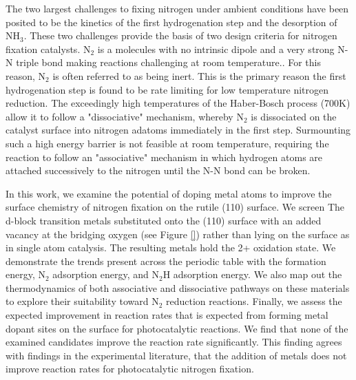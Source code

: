 \documentclass[catalysts,article,submit,moreauthors,pdftex,10pt,a4paper]{mdpi}
\theoremstyle{mdpi}
\newcounter{ex}
\newcounter{re}
\theoremstyle{mdpidefinition}
\begin{document}
The two largest challenges to fixing nitrogen under ambient conditions have been posited to be the kinetics of the first hydrogenation step and the desorption of NH$_3$.\cite{Hoskuldsson_2017,Singh_2017,Montoya_2015} These two challenges provide the basis of two design criteria for nitrogen fixation catalysts. N$_2$ is a molecules with no intrinsic dipole and a very strong N-N triple bond making reactions challenging at room temperature.\cite{Montoya_2015,Comer_2018}. For this reason, N$_2$ is often referred to as being inert. This is the primary reason the first hydrogenation step is found to be rate limiting for low temperature nitrogen reduction.\cite{Montoya_2015, Singh_2017, Hoskuldsson_2017, Comer_2018} The exceedingly high temperatures of the Haber-Bosch process (700K) allow it to follow a "dissociative" mechanism, whereby N$_2$ is dissociated on the catalyst surface into nitrogen adatoms immediately in the first step.\cite{Ullmann_amm_2006, Hellman_2006} Surmounting such a high energy barrier is not feasible at room temperature, requiring the reaction to follow an "associative" mechanism in which hydrogen atoms are attached successively to the nitrogen until the N-N bond can be broken.\cite{Montoya_2015}

In this work, we examine the potential of doping metal atoms to improve the surface chemistry of nitrogen fixation on the rutile (110) surface. We screen The d-block transition metals substituted onto the (110) surface with an added vacancy at the bridging oxygen (see Figure \ref{}) rather than lying on the surface as in single atom catalysis. The resulting metals hold the 2+ oxidation state. We demonstrate the trends present across the periodic table with the formation energy, N$_2$ adsorption energy, and N$_2$H adsorption energy. We also map out the thermodynamics of both associative and dissociative pathways on these materials to explore their suitability toward N$_2$ reduction reactions. Finally, we assess the expected improvement in reaction rates that is expected from forming metal dopant sites on the surface for photocatalytic reactions. We find that none of the examined candidates improve the reaction rate significantly. This finding agrees with findings in the experimental literature, that the addition of metals does not improve reaction rates for photocatalytic nitrogen fixation.
\end{document}
